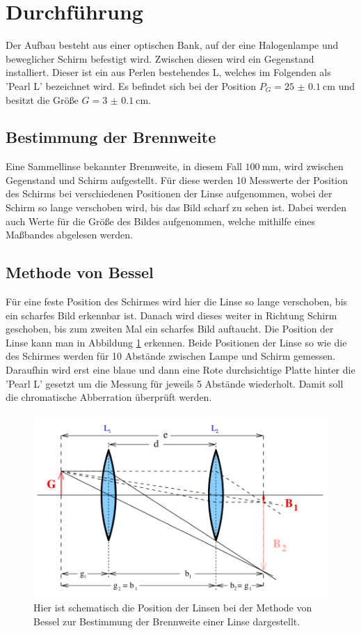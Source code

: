 \section{Durchführung}
\label{sec:Durchführung}
Der Aufbau besteht aus einer optischen Bank, auf der eine Halogenlampe und beweglicher Schirm befestigt wird. 
Zwischen diesen wird ein Gegenstand installiert. 
Dieser ist ein aus Perlen bestehendes L, welches im Folgenden als 'Pearl L' bezeichnet wird.
Es befindet sich bei der Position $P_G=\qty{25(0.1)}{\centi\meter}$ und besitzt die Größe $G=\qty{3(0.1)}{\centi\meter}$.

\subsection{Bestimmung der Brennweite}
Eine Sammellinse bekannter Brennweite, in diesem Fall $\qty{100}{\milli\meter}$, wird zwischen Gegenstand und Schirm aufgestellt.
Für diese werden 10 Messwerte der Position des Schirms bei verschiedenen Positionen der Linse aufgenommen, wobei der Schirm so lange verschoben wird, bis das Bild scharf zu sehen ist.
Dabei werden auch Werte für die Größe des Bildes aufgenommen, welche mithilfe eines Maßbandes abgelesen werden.

\subsection{Methode von Bessel}
Für eine feste Position des Schirmes wird hier die Linse so lange verschoben, bis ein scharfes Bild erkennbar ist. 
Danach wird dieses weiter in Richtung Schirm geschoben, bis zum zweiten Mal ein scharfes Bild auftaucht.
Die Position der Linse kann man in Abbildung \ref{fig:Bessel} erkennen.
Beide Positionen der Linse so wie die des Schirmes werden für 10 Abstände zwischen Lampe und Schirm gemessen.
Daraufhin wird erst eine blaue und dann eine Rote durchsichtige Platte hinter die 'Pearl L' gesetzt um die Messung für jeweils 5 Abstände wiederholt.
Damit soll die chromatische Abberration überprüft werden.

\begin{figure}[H]
    \includegraphics{Bilder/Bessel.png}
    \caption{Hier ist schematisch die Position der Linsen bei der Methode von Bessel zur Bestimmung der Brennweite einer Linse dargestellt.}
    \label{fig:Bessel}
\end{figure}


